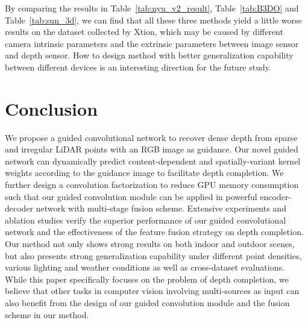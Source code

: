 \documentclass[journal]{IEEEtran}
\begin{document}
By comparing the results in Table~\ref{tab:nyu_v2_result}, Table~\ref{tab:B3DO} and Table~\ref{tab:sun_3d}, 
we can find that all these three methods yield a little worse results on the dataset collected by Xtion,
which may be caused by different camera intrinsic parameters and the extrinsic parameters between image sensor and depth sensor.
How to design method with better generalization capability between different devices is an interesting direction for the future study.


 

\section{Conclusion}
We propose a guided convolutional network to recover dense depth from sparse and irregular LiDAR points with an RGB image as guidance.
Our novel guided network can dynamically predict content-dependent and spatially-variant kernel weights according to the guidance image to facilitate depth completion.
We further design a convolution factorization to reduce GPU memory consumption
such that our guided convolution module can be applied in powerful encoder-decoder network with multi-stage fusion scheme.
Extensive experiments and ablation studies verify the superior performance of our guided convolutional network and the effectiveness of the feature fusion strategy on depth completion.
Our method not only shows strong results on both indoor and outdoor scenes,
but also presents strong generalization capability under different point densities, various lighting and weather conditions as well as cross-dataset evaluations.
While this paper specifically focuses on the problem of depth completion,
we believe that other tasks in computer vision involving multi-sources as input can also benefit from the design of our guided convolution module and the fusion scheme in our method. 
\ifCLASSOPTIONcaptionsoff
  \newpage
\fi












\end{document}
